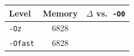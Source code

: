 \begin{tabular*}{\columnwidth}{@{\extracolsep\fill}lcc@{\extracolsep\fill}}
\toprule
\textbf{Level} & \textbf{Memory} & \textbf{$\Delta$ vs.\ \texttt{-O0}} \\
\midrule
\texttt{-Oz} & 6828 &  \\
\texttt{-Ofast} & 6828 &  \\
\bottomrule
\end{tabular*}
